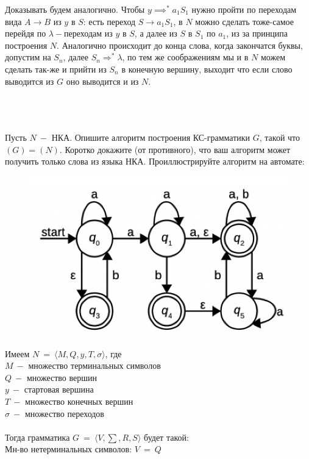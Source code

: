 \documentclass[10pt]{article}
\begin{document}
{\begin{enumerate}
		Доказывать будем аналогично. Чтобы $y\implies^*a_1S_1$ нужно пройти по переходам вида $A\rightarrow B$ из $y$ в $S$: есть переход $S\rightarrow a_1S_1$, в $N$ можно сделать тоже-самое перейдя по $\lambda-$переходам из $y$ в $S$, а далее из $S$ в $S_1$ по $a_1$, из за принципа построения $N$. Аналогично происходит до конца слова, когда закончатся буквы, допустим на $S_n$, далее $S_n\Rightarrow^*\lambda$, по тем же соображениям мы и в $N$ можем сделать так-же и прийти из $S_n$ в конечную вершину, выходит что если слово выводится из $G$ оно выводится и из $N$.\\\\
		\\\\
		{\Large\item Пусть $N\ -$ НКА. Опишите алгоритм построения КС-грамматики $G$, такой что $(G)=(N)$. Коротко докажите (от противного), что ваш алгоритм может получить только слова из языка НКА. Проиллюстрируйте алгоритм на автомате:}
		\begin{figure}[H]
			\includegraphics[scale=0.6]{1}
		\end{figure}
		Имеем $N\ =\ \langle M,Q,y,T,\sigma\rangle$, где\\
		$M\ -$ множество терминальных символов\\
		$Q\ -$ множество вершин\\
		$y\ -$ стартовая вершина\\
		$T\ -$ множество конечных вершин\\
		$\sigma\ -$ множество переходов\\\\
		Тогда грамматика $G\ =\ \langle V,\sum,R,S\rangle$ будет такой:\\
		Мн-во нетерминальных символов: $V\ =\ Q$\\

\end{enumerate}}
\end{document}
